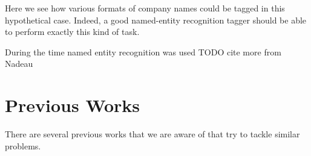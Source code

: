Here we see how various formats of company names could be tagged in this hypothetical case. Indeed, a good named-entity recognition tagger should be able to perform exactly this kind of task.

During the time named entity recognition was used 
TODO cite more from Nadeau


\section{Previous Works}

There are several previous works that we are aware of that try to tackle similar problems. 